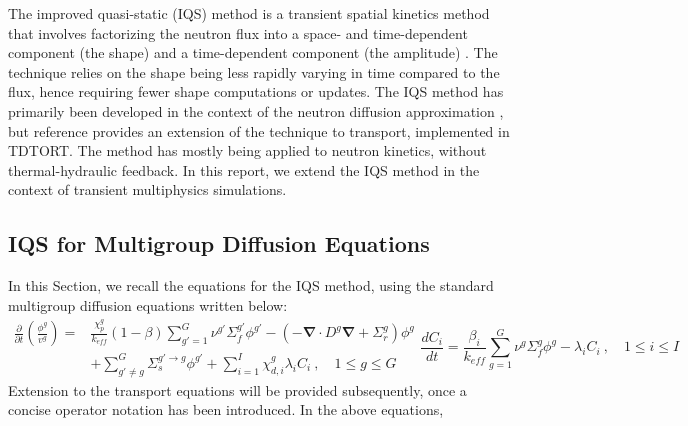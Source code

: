 \documentclass[12pt]{scrartcl}
\renewcommand{\div}{\bs{\nabla}\! \cdot \!}
\newcommand{\grad}{\bs{\nabla}}
\newcommand{\bs}[1]{\mathbf{#1}}
\newcommand{\keff}{k_\textit{eff}}
\newcommand{\be}{\begin{equation}}
\newcommand{\ee}{\end{equation}}
\begin{document}
\par
The improved quasi-static (IQS) method is a transient spatial kinetics method that involves factorizing the neutron flux into a space- and time-dependent component (the shape) and a time-dependent component (the amplitude) \cite{Ott_1966,Dulla2008}. The technique relies on the shape being less rapidly varying in time compared to the flux, hence requiring fewer shape computations or updates. The IQS method has primarily been developed in the context of the neutron diffusion approximation \cite{Ban_2012,Ferguson_1973}, but reference \cite{Goluoglu_2001} provides an extension of the technique to transport, implemented in TDTORT. The method has mostly being applied to neutron kinetics, without thermal-hydraulic feedback. In this report, we extend the IQS method in the context of transient multiphysics simulations.


\subsection{IQS for Multigroup Diffusion Equations}

In this Section, we recall the equations for the IQS method, using the standard multigroup diffusion equations written below:
\begin{subequations}
\begin{align}
\frac{\partial}{\partial t}\left(\frac{\phi^g}{v^g}\right)  =& \frac{\chi_p^g}{\keff} (1-\beta)\sum_{g'=1}^G  \nu^{g'} \Sigma_f^{g'} \phi^{g'} -  \left( -\div D^g \grad  + \Sigma_r^g \right) \phi^g  \nonumber \\
&  + \sum_{g'\neq g}^G\Sigma_s^{g'\to g} \phi^{g'}  + \sum_{i=1}^I\chi_{d,i}^g\lambda_i C_i \ , \quad 1 \le g \le G 
\label{eq:flux}
\end{align}
\be
\frac{dC_i}{dt} = \frac{\beta_i}{\keff}\sum_{g=1}^G\nu^{g} \Sigma_f^g \phi^{g} - \lambda_i C_i \ , \quad 1 \le i \le I 
\label{eq:precursor}
\ee
\end{subequations}
%
Extension to the transport equations will be provided subsequently, once a concise operator notation has been introduced. 
In the above equations,  \\
\end{document}
